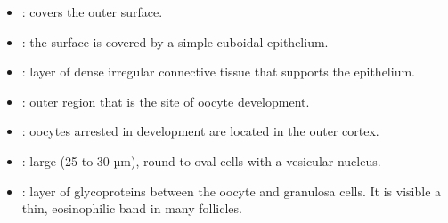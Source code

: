 \begin{multicols}{2}
\begin{itemize}
  \item {}: covers the outer surface. 
  
  \begin{center}
  \end{center}
   
  \item {}: the surface is covered by a simple cuboidal epithelium.
  
  \begin{center}
  \end{center}
  
  \item {}: layer of dense irregular connective tissue that supports the epithelium.
  \begin{center}
  \end{center}
  
  \item {}: outer region that is the site of oocyte development. 
  
  \begin{center}
  \end{center}
  
  \item {}: oocytes arrested in development are located in the outer cortex. 
  
  \begin{center}
  \end{center}
  
  \item {}: large (25 to 30 µm), round to oval cells with a vesicular nucleus.
  
  \begin{center}
  \end{center}
  
  \item {}:  layer of glycoproteins between the oocyte and granulosa cells. It is visible a thin, eosinophilic band in many follicles.
  
  \begin{center}
  \end{center}
  

\end{itemize}
\end{multicols}
